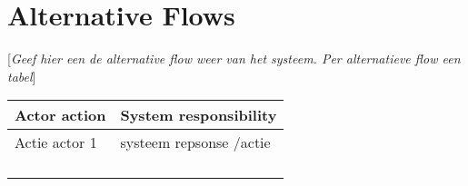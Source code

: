 \documentclass[a4paper, 11pt, oneside]{article}
\begin{document}
\section{Alternative Flows}
{[}\textit{Geef hier een de alternative flow weer van het systeem. Per alternatieve flow een tabel}{]}

\begin{table}[H]
	\centering
	\begin{tabular}{|l|l|}
		\hline
		\rowcolor[HTML]{C0C0C0} 
		Actor action  & System responsibility   \\ \hline
		Actie actor 1 & systeem repsonse /actie \\ \hline
		&                         \\ \hline
		&                         \\ \hline
		&                         \\ \hline
		&                         \\ \hline
	\end{tabular}
\end{table}
\end{document}
